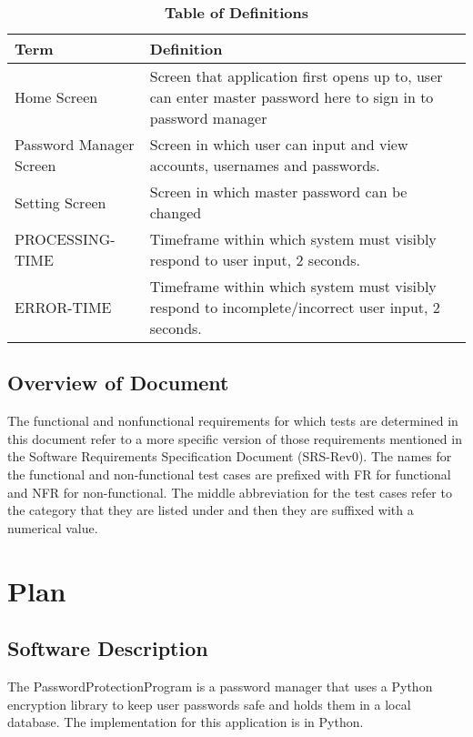 \documentclass[12pt, titlepage]{article}
\begin{document}
\begin{table}[!htbp]
\caption{\textbf{Table of Definitions}} \label{Table}

    \begin{tabularx}{\textwidth}{p{3cm}X}
        \toprule
        \textbf{Term} & \textbf{Definition}\\
        \midrule
        Home Screen & Screen that application first opens up to, user can enter master password here to sign in to password manager\\\hline
        Password Manager Screen & Screen in which user can input and view accounts, usernames and passwords.\\\hline
        Setting Screen & Screen in which master password can be changed\\\hline
        PROCESSING-TIME & Timeframe within which system must visibly  respond to user input, 2 seconds.\\\hline
        ERROR-TIME & Timeframe within which system must visibly respond to incomplete/incorrect user input, 2 seconds.\\
        \bottomrule
    \end{tabularx}

\end{table}	

\subsection{Overview of Document}
The functional and nonfunctional requirements for which tests are determined in this document refer to a more specific version of those requirements mentioned in the Software Requirements Specification Document (SRS-Rev0). The names for the functional and non-functional test cases are prefixed with FR for functional and NFR for non-functional. The middle abbreviation for the test cases refer to the category that they are listed under and then they are suffixed with a numerical value.

\section{Plan}

\subsection{Software Description}
The PasswordProtectionProgram is a password manager that uses a Python encryption library to keep user passwords safe and holds them in a local database. The implementation for this application is in Python.
\end{document}
